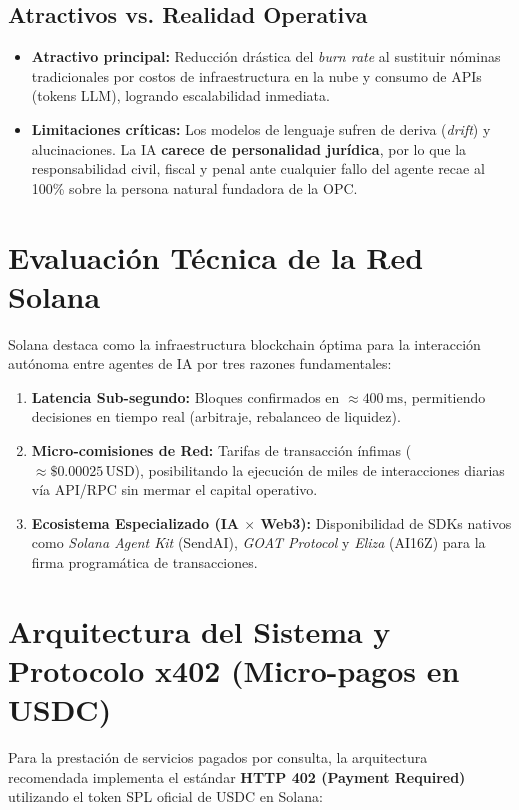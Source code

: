 \documentclass[11pt,a4paper]{article}
\begin{document}
\subsection{Atractivos vs. Realidad Operativa}
\begin{itemize}[leftmargin=*]
    \item \textbf{Atractivo principal:} Reducción drástica del \emph{burn rate} al sustituir nóminas tradicionales por costos de infraestructura en la nube y consumo de APIs (tokens LLM), logrando escalabilidad inmediata.
    \item \textbf{Limitaciones críticas:} Los modelos de lenguaje sufren de deriva (\emph{drift}) y alucinaciones. La IA \textbf{carece de personalidad jurídica}, por lo que la responsabilidad civil, fiscal y penal ante cualquier fallo del agente recae al 100\% sobre la persona natural fundadora de la OPC.
\end{itemize}

\section{Evaluación Técnica de la Red Solana}

Solana destaca como la infraestructura blockchain óptima para la interacción autónoma entre agentes de IA por tres razones fundamentales:

\begin{enumerate}
    \item \textbf{Latencia Sub-segundo:} Bloques confirmados en $\approx 400\,\text{ms}$, permitiendo decisiones en tiempo real (arbitraje, rebalanceo de liquidez).
    \item \textbf{Micro-comisiones de Red:} Tarifas de transacción ínfimas ($\approx \$0.00025\,\text{USD}$), posibilitando la ejecución de miles de interacciones diarias vía API/RPC sin mermar el capital operativo.
    \item \textbf{Ecosistema Especializado (IA $\times$ Web3):} Disponibilidad de SDKs nativos como \emph{Solana Agent Kit} (SendAI), \emph{GOAT Protocol} y \emph{Eliza} (AI16Z) para la firma programática de transacciones.
\end{enumerate}

\section{Arquitectura del Sistema y Protocolo x402 (Micro-pagos en USDC)}

Para la prestación de servicios pagados por consulta, la arquitectura recomendada implementa el estándar \textbf{HTTP 402 (Payment Required)} utilizando el token SPL oficial de USDC en Solana:
\end{document}
